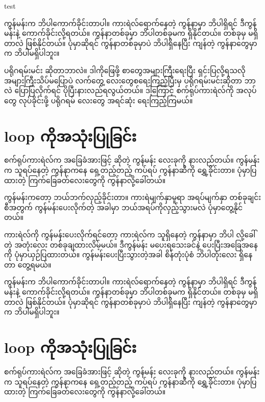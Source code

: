 \begin{sloppypar}
test 

 ကွန်မန်းက ဘိပါကောက်ခိုင်းတာပါ။ ကားရဲလ်ရောက်နေတဲ့ ကွန်နာမှာ ဘိပါရှိရင် ဒီကွန်မန်းနဲ့ ကောက်ခိုင်းလို့ရတယ်။ ကွန်နာတစ်ခုမှာ ဘိပါတစ်ခုမက ရှိနိုင်တယ်။ တစ်ခုမှ မရှိတာလဲ ဖြစ်နိုင်တယ်။ ပုံမှာဆိုရင် ကွန်နာတစ်ခုမှာပဲ ဘိပါရှိနေပြီး ကျန်တဲ့ ကွန်နာတွေမှာက ဘိပါမရှိပါဘူး။

ပရိုဂရမ်းမင်း ဆိုတာဘာလဲ။ ဒါကိုဖြေဖို့ စာတွေအများကြီးရေးပြီး ရှင်းပြလို့ရသလို အများကြီးသိပ်မပြောပဲ လက်တွေ့  လေးတွေစရေးကြည့်ပြီးမှ ပရိုဂရမ်းမင်းဆိုတာ ဘာလဲ ပြောပြလိုက်ရင် ပိုပြီးနားလည်ရလွယ်တယ်။ ဒါ့ကြောင့် စက်ရုပ်ကားရဲလ်ကို အလုပ်တွေ လုပ်ခိုင်းဖို့ ပရိုဂရမ် လေးတွေ အရင်ဆုံး ရေးကြည့်ကြမယ်။
\section{{} loop ကိုအသုံးပြုခြင်း}

စက်ရုပ်ကားရဲလ်က အခြေခံအားဖြင့်  ဆိုတဲ့ ကွန်မန်း လေးခုကို နားလည်တယ်။  ကွန်မန်းက သူရပ်နေတဲ့ ကွန်နာကနေ ရှေ့တည့်တည့် ကပ်ရပ် ကွန်နာဆီကို ရွှေ့ခိုင်းတာ။ ပုံမှာပြထားတဲ့ ကြက်ခြေခတ်လေးတွေကို ကွန်နာလို့ခေါ်တယ်။ 

 ကွန်မန်းကတော့ ဘယ်ဘက်လှည့်ခိုင်းတာ။ ကားရဲမျက်နှာမူရာ အရပ်မျက်နှာ တစ်ခုချင်းစီအတွက်  ကွန်မန်းပေးလိုက်တဲ့ အခါမှာ ဘယ်အရပ်ကိုလှည့်သွားမလဲ ပုံမှာတွေ့နိုင်တယ်။

ကားရဲလ်ကို  ကွန်မန်းပေးလိုက်ရင်တော့ ကားရဲလ်က သူရှိနေတဲ့ ကွန်နာမှာ ဘိပါ လို့ခေါ်တဲ့ အတုံးလေး တစ်ခုချထားလိမ့်မယ်။ ဒီကွန်မန်း မပေးရသေးခင်နဲ့ ပေးပြီးအခြေအနေကို ပုံမှာယှဉ်ပြထားတယ်။ ကွန်မန်းပေးပြီးသွားတဲ့အခါ စိန်တုံးပုံစံ ဘိပါတုံးလေး ရှိနေတာ တွေ့ရမယ်။ 

 ကွန်မန်းက ဘိပါကောက်ခိုင်းတာပါ။ ကားရဲလ်ရောက်နေတဲ့ ကွန်နာမှာ ဘိပါရှိရင် ဒီကွန်မန်းနဲ့ ကောက်ခိုင်းလို့ရတယ်။ ကွန်နာတစ်ခုမှာ ဘိပါတစ်ခုမက ရှိနိုင်တယ်။ တစ်ခုမှ မရှိတာလဲ ဖြစ်နိုင်တယ်။ ပုံမှာဆိုရင် ကွန်နာတစ်ခုမှာပဲ ဘိပါရှိနေပြီး ကျန်တဲ့ ကွန်နာတွေမှာက ဘိပါမရှိပါဘူး။
\section{{} loop ကိုအသုံးပြုခြင်း}

စက်ရုပ်ကားရဲလ်က အခြေခံအားဖြင့်  ဆိုတဲ့ ကွန်မန်း လေးခုကို နားလည်တယ်။  ကွန်မန်းက သူရပ်နေတဲ့ ကွန်နာကနေ ရှေ့တည့်တည့် ကပ်ရပ် ကွန်နာဆီကို ရွှေ့ခိုင်းတာ။ ပုံမှာပြထားတဲ့ ကြက်ခြေခတ်လေးတွေကို ကွန်နာလို့ခေါ်တယ်။ 


\end{sloppypar}
